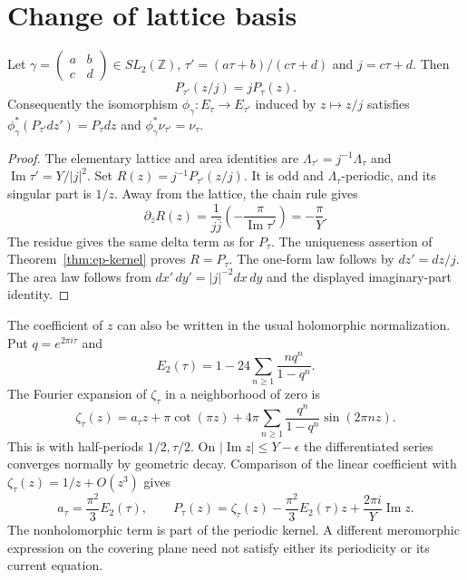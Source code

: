 \section{Change of lattice basis}

\begin{theorem}\label{thm:ep-modular}
Let $\gamma=\left(\begin{smallmatrix}a&b\\c&d\end{smallmatrix}\right)\in SL_2(\mathbb Z)$,
$\tau'=(a\tau+b)/(c\tau+d)$ and $j=c\tau+d$.
Then
\begin{equation}\label{eq:ep-modular}
 P_{\tau'}(z/j)=jP_\tau(z).
\end{equation}
Consequently the isomorphism $\phi_\gamma:E_\tau\to E_{\tau'}$ induced by $z\mapsto z/j$ satisfies
$\phi_\gamma^*(P_{\tau'}dz')=P_\tau dz$ and $\phi_\gamma^*\nu_{\tau'}=\nu_\tau$.
\end{theorem}
\begin{proof}
The elementary lattice and area identities are
$\Lambda_{\tau'}=j^{-1}\Lambda_\tau$ and
$\operatorname{Im}\tau'=Y/|j|^2$.
Set $R(z)=j^{-1}P_{\tau'}(z/j)$.
It is odd and $\Lambda_\tau$-periodic, and its singular part is $1/z$.
Away from the lattice, the chain rule gives
\[
 \partial_{\bar z}R(z)
 =\frac1{j\bar j}\left(-\frac{\pi}{\operatorname{Im}\tau'}\right)
 =-\frac\pi Y.
\]
The residue gives the same delta term as for $P_\tau$.
The uniqueness assertion of Theorem~\ref{thm:ep-kernel} proves $R=P_\tau$.
The one-form law follows by $dz'=dz/j$.
The area law follows from $dx'\,dy'=|j|^{-2}dx\,dy$ and the displayed imaginary-part identity.
\end{proof}

The coefficient of $z$ can also be written in the usual holomorphic normalization.
Put $q=e^{2\pi i\tau}$ and
\[
 E_2(\tau)=1-24\sum_{n\geq1}\frac{nq^n}{1-q^n}.
\]
The Fourier expansion of $\zeta_\tau$ in a neighborhood of zero is
\[
 \zeta_\tau(z)=a_\tau z+\pi\cot(\pi z)
              +4\pi\sum_{n\geq1}\frac{q^n}{1-q^n}\sin(2\pi nz).
\]
This is \cite[Eq.~23.8.2]{DLMFell} with half-periods $1/2,\tau/2$.
On $|\operatorname{Im}z|\leq Y-\epsilon$ the differentiated series converges normally by geometric decay.
Comparison of the linear coefficient with $\zeta_\tau(z)=1/z+O(z^3)$ gives
\begin{equation}\label{eq:ep-E2}
 a_\tau=\frac{\pi^2}{3}E_2(\tau),\qquad
 P_\tau(z)=\zeta_\tau(z)-\frac{\pi^2}{3}E_2(\tau)z
                       +\frac{2\pi i}{Y}\operatorname{Im}z.
\end{equation}
The nonholomorphic term is part of the periodic kernel.
A different meromorphic expression on the covering plane need not satisfy either its periodicity or its current equation.

